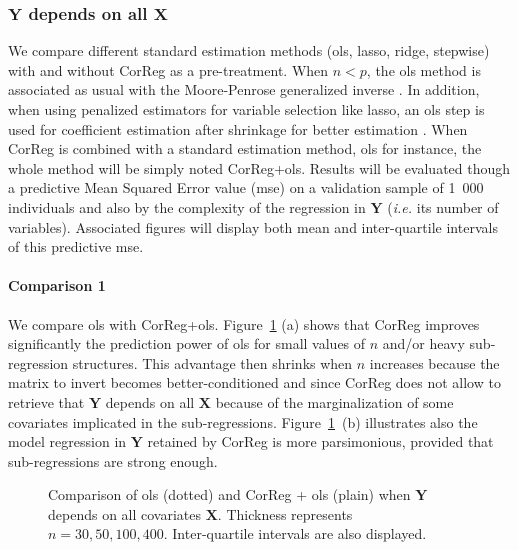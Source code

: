 \documentclass[11pt,a4paper]{article}
\begin{document}
\subsubsection{$\boldsymbol{Y}$ depends on all $\boldsymbol{X}$}

We compare different standard estimation methods ({\sc ols}, {\sc lasso}, ridge, stepwise) with and without {\sc CorReg} as a pre-treatment. When $n<p$, the {\sc ols} method is associated as usual with the Moore-Penrose generalized inverse \cite{katsikis2008fast}. In addition, when using penalized estimators for variable selection like {\sc lasso}, an {\sc ols} step is used for coefficient estimation after shrinkage for better estimation \cite{SAM10088}.	
When {\sc CorReg} is combined with a standard estimation method, {\sc ols} for instance, the whole method will be simply noted {\sc CorReg}+{\sc ols}. Results will be evaluated though a predictive Mean Squared Error value ({\sc mse}) on a validation sample of 1~000 individuals and also by the complexity of the regression in $\boldsymbol{Y}$ ({\it i.e.} its number of variables). Associated figures will display both mean and inter-quartile intervals of this predictive {\sc mse}.

\paragraph{Comparison 1} We compare {\sc ols} with {\sc CorReg}+{\sc ols}.
Figure~\ref{toutOLS} (a) shows that {\sc CorReg} improves significantly the prediction power of {\sc ols} for small values of $n$ and/or heavy sub-regression structures. This advantage then shrinks when $n$ increases because the matrix to invert becomes better-conditioned and since {\sc CorReg} does not allow to retrieve that $\boldsymbol{Y}$ depends on all $\boldsymbol{X}$ because of the marginalization of some covariates implicated in the sub-regressions. Figure~\ref{toutOLS}~(b) illustrates also the model regression in $\boldsymbol{Y}$ retained by {\sc CorReg} is more parsimonious, provided that sub-regressions are strong enough.


\begin{figure}[!ht]
	 \quad
	\caption{Comparison of {\sc ols} (dotted) and {\sc CorReg} + {\sc ols} (plain) when $\boldsymbol{Y}$ depends on all covariates ${\boldsymbol{X}}$. Thickness represents $n=30,50,100,400$.  Inter-quartile intervals are also displayed.}\label{toutOLS}
\end{figure}
\end{document}
